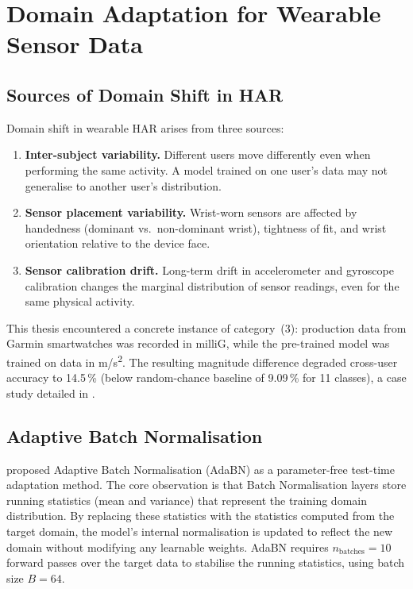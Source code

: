 \section{Domain Adaptation for Wearable Sensor Data}
\label{sec:bg_domain_adaptation}

\subsection{Sources of Domain Shift in HAR}

Domain shift in wearable HAR arises from three sources:
\begin{enumerate}
  \item \textbf{Inter-subject variability.} Different users move differently
        even when performing the same activity. A model trained on one user's
        data may not generalise to another user's distribution.
  \item \textbf{Sensor placement variability.} Wrist-worn sensors are affected
        by handedness (dominant vs.\ non-dominant wrist), tightness of fit,
        and wrist orientation relative to the device face.
  \item \textbf{Sensor calibration drift.} Long-term drift in accelerometer
        and gyroscope calibration changes the marginal distribution of sensor
        readings, even for the same physical activity.
\end{enumerate}

This thesis encountered a concrete instance of category~(3): production data
from Garmin smartwatches was recorded in milliG, while the pre-trained model
was trained on data in m/s\textsuperscript{2}.
The resulting magnitude difference degraded cross-user accuracy to 14.5\,\%
(below random-chance baseline of 9.09\,\% for 11 classes), a case study
detailed in .

\subsection{Adaptive Batch Normalisation}

\citet{li2018adabn} proposed Adaptive Batch Normalisation (AdaBN) as a
parameter-free test-time adaptation method.
The core observation is that Batch Normalisation \citep{ioffe2015batch} layers
store running statistics (mean and variance) that represent the training domain
distribution.
By replacing these statistics with the statistics computed from the target
domain, the model's internal normalisation is updated to reflect the new domain
without modifying any learnable weights.
AdaBN requires $n_{\text{batches}} = 10$ forward passes over the target data
to stabilise the running statistics, using batch size $B = 64$.

